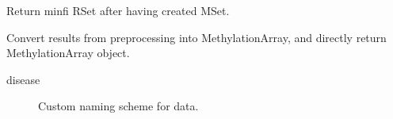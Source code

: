 \documentclass[letterpaper,10pt,english]{sphinxmanual}
\begin{document}
\begin{fulllineitems}
\begin{fulllineitems}
\begin{description}
\end{description}

\end{fulllineitems}


\begin{fulllineitems}
\label{\detokenize{index:pymethylprocess.PreProcessDataTypes.PreProcessIDAT.return_beta}}
Return minfi RSet after having created MSet.

\end{fulllineitems}


\begin{fulllineitems}
\label{\detokenize{index:pymethylprocess.PreProcessDataTypes.PreProcessIDAT.to_methyl_array}}
Convert results from preprocessing into MethylationArray, and directly return MethylationArray object.
\begin{description}
\item[{disease}] \leavevmode
Custom naming scheme for data.

\end{description}

\end{fulllineitems}


\end{fulllineitems}

\end{document}
